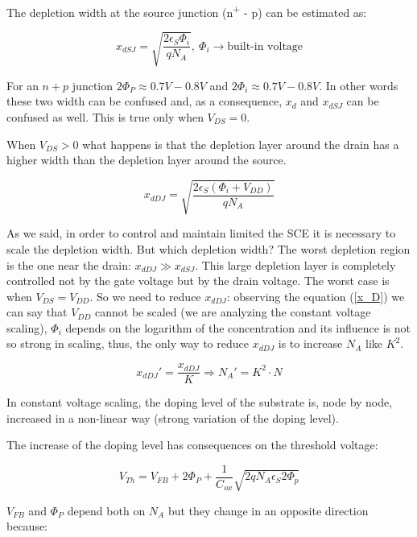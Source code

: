 \documentclass[a4paper, 12pt, twoside, openright]{report}
\newcommand{\super}{\textsuperscript}
\begin{document}
The depletion width at the source junction (n\super{+} - p) can be estimated as:

	\begin{equation}
	x_{dSJ} = \sqrt{\frac{2 \epsilon_S \Phi_i}{q N_A}},\ \Phi_i \rightarrow \text{built-in voltage}
	\label{}
	\end{equation}

For an $n+p$ junction $2 \Phi_P \approx 0.7 V - 0.8 V$ and $2 \Phi_i \approx 0.7 V - 0.8 V$. In other words these two width can be confused and, as a consequence, $x_{d}$ and $x_{dSJ}$ can be confused as well. This is true only when $V_{DS} = 0$.

When $V_{DS} > 0$ what happens is that the depletion layer around the drain has a higher width than the depletion layer around the source.

	\begin{equation}
	x_{dDJ} = \sqrt{\frac{2 \epsilon_S (\Phi_i + V_{DD})}{q N_A}}
	\label{x_D}
	\end{equation}

As we said, in order to control and maintain limited the SCE it is necessary to scale the depletion width. But which depletion width? The worst depletion region is the one near the drain: $x_{dDJ} \gg x_{dSJ}$. This large depletion layer is completely controlled not by the gate voltage but by the drain voltage. The worst case is when  $V_{DS} = V_{DD}$. So we need to reduce $x_{dDJ}$: observing the equation (\ref{x_D}) we can say that $V_{DD}$ cannot be scaled (we are analyzing the constant voltage scaling), $\Phi_i$ depends on the logarithm of the concentration and its influence is not so strong in scaling, thus, the only way to reduce $x_{dDJ}$ is to increase $N_{A}$ like $K^{2}$.

	\begin{equation}
	x_{dDJ}' = \frac{x_{dDJ}}{K} \Rightarrow N_A' = K^2 \cdot N
	\label{x_D}
	\end{equation}

In constant voltage scaling, the doping level of the substrate is, node by node, increased in a non-linear way (strong variation of the doping level).

The increase of the doping level has consequences on the threshold voltage:

	\begin{equation}
	V_{Th} = V_{FB}+2\Phi_P+\frac{1}{C_{ox}}\sqrt{2qN_A\epsilon_S 2\Phi_p}
	\end{equation}

$V_{FB}$ and $\Phi_P$ depend both on $N_{A}$ but they change in an opposite direction because: 
\end{document}
